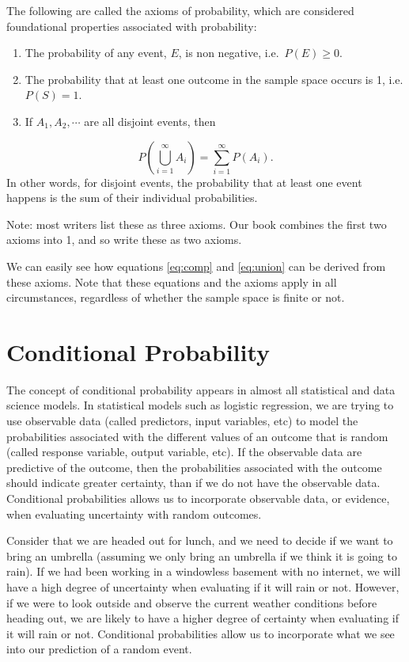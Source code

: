 \documentclass[
]{book}
\providecommand{\tightlist}{%
  \setlength{\itemsep}{0pt}\setlength{\parskip}{0pt}}
\begin{document}
The following are called the axioms of probability, which are considered foundational properties associated with probability:

\begin{enumerate}
\def\labelenumi{\arabic{enumi}.}
\tightlist
\item
  The probability of any event, \(E\), is non negative, i.e.~\(P(E) \geq 0\).
\item
  The probability that at least one outcome in the sample space occurs is 1, i.e.\(P(S) = 1\).
\item
  If \(A_1, A_2, \cdots\) are all disjoint events, then
\end{enumerate}

\[
P(\bigcup\limits_{i=1}^{\infty} A_{i}) = \sum_{i=1}^{\infty} P(A_i).
\]
In other words, for disjoint events, the probability that at least one event happens is the sum of their individual probabilities.

Note: most writers list these as three axioms. Our book combines the first two axioms into 1, and so write these as two axioms.

We can easily see how equations \eqref{eq:comp} and \eqref{eq:union} can be derived from these axioms. Note that these equations and the axioms apply in all circumstances, regardless of whether the sample space is finite or not.

\hypertarget{condprob}{%
\section{Conditional Probability}\label{condprob}}

The concept of conditional probability appears in almost all statistical and data science models. In statistical models such as logistic regression, we are trying to use observable data (called predictors, input variables, etc) to model the probabilities associated with the different values of an outcome that is random (called response variable, output variable, etc). If the observable data are predictive of the outcome, then the probabilities associated with the outcome should indicate greater certainty, than if we do not have the observable data. Conditional probabilities allows us to incorporate observable data, or evidence, when evaluating uncertainty with random outcomes.

Consider that we are headed out for lunch, and we need to decide if we want to bring an umbrella (assuming we only bring an umbrella if we think it is going to rain). If we had been working in a windowless basement with no internet, we will have a high degree of uncertainty when evaluating if it will rain or not. However, if we were to look outside and observe the current weather conditions before heading out, we are likely to have a higher degree of certainty when evaluating if it will rain or not. Conditional probabilities allow us to incorporate what we see into our prediction of a random event.
\end{document}
